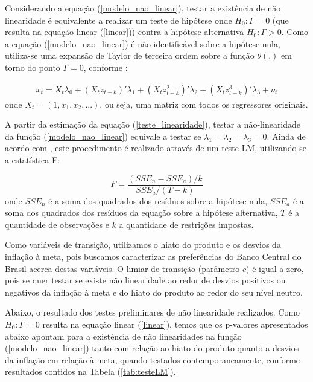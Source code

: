 \documentclass[
	article,			%
	11pt,				%
	oneside,			%
	a4paper,			%
	english,			%
	brazil,				%
	]{abntex2}
\begin{document}
	Considerando a equação (\ref{modelo_nao_linear}), testar a existência de não linearidade é equivalente a realizar um teste de hipótese onde $H_0: \Gamma = 0$ (que resulta na equação linear (\ref{linear}))  contra a hipótese alternativa $H_0: \Gamma > 0$. Como a equação (\ref{modelo_nao_linear}) é não identificável sobre a hipótese nula, utiliza-se uma expansão de Taylor de terceira ordem sobre a função $\theta(.)$ em torno do ponto $\Gamma = 0$, conforme :
	
	\begin{eqnarray} \label{teste_linearidade}
		x_t =  X_t \lambda_0 + (X_t z_{t-k})' \lambda_1 + (X_t z_{t-k}^2)' \lambda_2 + (X_t z_{t-k}^3)' \lambda_3 + \nu_t
	\end{eqnarray}
	onde $X_t = (1, x_1, x_2, ...)$, ou seja, uma matriz com todos os regressores originais.
	
	A partir da estimação da equação (\ref{teste_linearidade}), testar a não-linearidade da função (\ref{modelo_nao_linear}) equivale a testar se $\lambda_1 = \lambda_2 = \lambda_3 = 0$. Ainda de acordo com , este procedimento é realizado através de um teste LM, utilizando-se a estatística F:
	
	\begin{equation} \label{estatistica_f}
		F = \frac{(SSE_n - SSE_a) / k}{SSE_a / (T - k)}
	\end{equation}
	onde $SSE_n$ é a soma dos quadrados dos resíduos sobre a hipótese nula, $SSE_a$ é a soma dos quadrados dos resíduos da equação sobre a hipótese alternativa, $T$ é a quantidade de observações e $k$ a quantidade de restrições impostas.
	
	Como variáveis de transição, utilizamos o hiato do produto e os desvios da inflação à meta, pois buscamos caracterizar as preferências do Banco Central do Brasil acerca destas variáveis. O limiar de transição (parâmetro $c$) é igual a zero, pois se quer testar se existe não linearidade ao redor de desvios positivos ou negativos da inflação à meta e do hiato do produto ao redor do seu nível neutro.
	
	Abaixo, o resultado dos testes preliminares de não linearidade realizados. Como $H_0: \Gamma = 0$ resulta na equação linear (\ref{linear}), temos que os p-valores apresentados abaixo apontam para a existência de não linearidades na função (\ref{modelo_nao_linear}) tanto com relação ao hiato do produto quanto a desvios da inflação em relação à meta, quando testados contemporaneamente, conforme resultados contidos na Tabela (\ref{tab:testeLM}).
	
\end{document}
